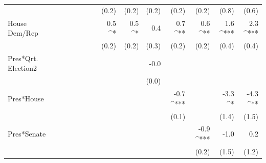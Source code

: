 \documentclass[a4paper]{article}\usepackage{graphicx, color}
\begin{document}
\begin{table}[ht]
\begin{center}
{\begin{tabular}{ l D{.}{.}{1}D{.}{.}{1}D{.}{.}{1}D{.}{.}{1}D{.}{.}{1}D{.}{.}{1}D{.}{.}{1}D{.}{.}{1}D{.}{.}{1}D{.}{.}{1}D{.}{.}{1}D{.}{.}{1}D{.}{.}{1} }
                     &                 &                 &                 &                 &                 &                 & (0.2)           & (0.2)           & (0.2)           & (0.2)           & (0.2)           & (0.8)           & (0.6)          \\ 
House Dem/Rep        &                 &                 &                 &                 &                 &                 & 0.5 ^*          & 0.5 ^*          & 0.4             & 0.7 ^{**}       & 0.6 ^{**}       & 1.6 ^{***}      & 2.3 ^{***}     \\ 
                     &                 &                 &                 &                 &                 &                 & (0.2)           & (0.2)           & (0.3)           & (0.2)           & (0.2)           & (0.4)           & (0.4)          \\ 
Pres*Qrt. Election2  &                 &                 &                 &                 &                 &                 &                 &                 & -0.0            &                 &                 &                 &                \\ 
                     &                 &                 &                 &                 &                 &                 &                 &                 & (0.0)           &                 &                 &                 &                \\ 
Pres*House           &                 &                 &                 &                 &                 &                 &                 &                 &                 & -0.7 ^{***}     &                 & -3.3 ^*         & -4.3 ^{**}     \\ 
                     &                 &                 &                 &                 &                 &                 &                 &                 &                 & (0.1)           &                 & (1.4)           & (1.5)          \\ 
Pres*Senate          &                 &                 &                 &                 &                 &                 &                 &                 &                 &                 & -0.9 ^{***}     & -1.0            & 0.2            \\ 
                     &                 &                 &                 &                 &                 &                 &                 &                 &                 &                 & (0.2)           & (1.5)           & (1.2)          \\ 

\end{tabular}}
\end{center}
\end{table}
\end{document}
